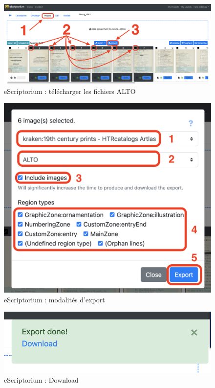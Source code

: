 \documentclass[a4paper,12pt,twoside]{book}
\begin{document}
\begin{figure}[ht]
	\centering
	\includegraphics[scale=0.3]{export_eScriptorium.png}		
	\caption{eScriptorium : télécharger les fichiers ALTO}
	\label{frise2}
\end{figure}
\begin{figure}[ht]
	\centering
	\includegraphics[scale=0.4]{export2_eScriptorium.png}		
	\caption{eScriptorium : modalités d'export}
	\label{modalites}
\end{figure}
\begin{figure}[ht]
	\centering
	\includegraphics[scale=0.5]{download_eScriptorium.png}		
	\caption{eScriptorium : Download}
	\label{download}
\end{figure}
\end{document}
